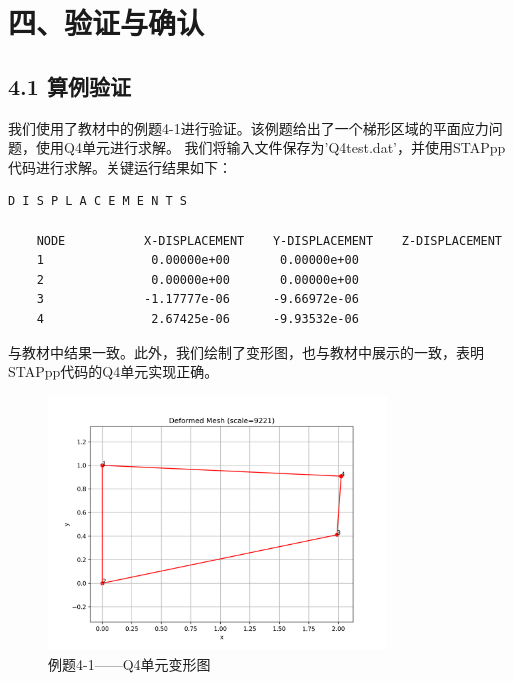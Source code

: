 \documentclass[12pt]{article}
\begin{document}
\section*{四、验证与确认}
\subsection*{4.1 算例验证}
我们使用了教材中的例题4-1进行验证。该例题给出了一个梯形区域的平面应力问题，使用Q4单元进行求解。
我们将输入文件保存为'Q4test.dat'，并使用STAPpp代码进行求解。关键运行结果如下：
\begin{verbatim}
D I S P L A C E M E N T S

    NODE           X-DISPLACEMENT    Y-DISPLACEMENT    Z-DISPLACEMENT
    1               0.00000e+00       0.00000e+00
    2               0.00000e+00       0.00000e+00
    3              -1.17777e-06      -9.66972e-06
    4               2.67425e-06      -9.93532e-06
\end{verbatim}
与教材中结果一致。此外，我们绘制了变形图，也与教材中展示的一致，表明STAPpp代码的Q4单元实现正确。\\
\begin{figure}[htbp]
    \centering
    \includegraphics[width=0.8\textwidth]{data/Q4test_deformed.png}
    \caption{例题4-1——Q4单元变形图}
\end{figure}
\end{document}
